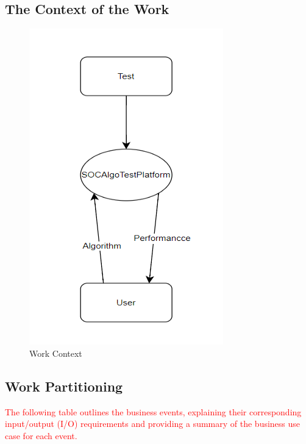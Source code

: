 \documentclass[12pt]{article}
\begin{document}
\subsection{The Context of the Work}
\begin{figure}[H]
    \centering
    \includegraphics[width=0.5\linewidth]{diagrams/context.png}
    \caption{Work Context}
\end{figure}
\subsection{Work Partitioning}
\textcolor{red}{The following table outlines the business events, explaining their corresponding input/output (I/O) requirements and providing a summary of the business use case for each event.}
\end{document}

